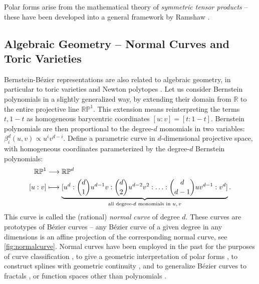 \documentclass[12pt,final,3p]{elsarticle}
\begin{document}
Polar forms arise from the mathematical theory of \emph{symmetric tensor products} -- these have been developed into a general  framework by Ramshaw \cite{ramshaw2001paired}.

\subsection{Algebraic Geometry -- Normal Curves and Toric Varieties}\label{sec:motivation:newton}

Bernstein-B\'{e}zier representations are also related to algebraic geometry, in particular to toric varieties and Newton polytopes \cite{sottile2015algebraic}. Let us consider Bernstein polynomials in a slightly generalized way, by extending their domain from $\mathbb{R}$ to the entire projective line $\mathbb{RP}^{1}$.  This extension means reinterpreting the terms $t,1-t$ as homogeneous barycentric coordinates $[u:v] = [t:1-t]$. Bernstein polynomials are then proportional to the  degree-$d$ monomials in two variables: $\beta^{d}_{i}(u,v) \propto u^{i}v^{d-i}$. Define a parametric curve in $d$-dimensional projective space, with homogeneous coordinates parameterized by the degree-$d$ Bernstein polynomials:
\begin{align}\label{eq:veronese} \notag \mathbb{RP}^{1} & \longrightarrow \mathbb{RP}^{d} \\
\left[u : v\right] & \longmapsto \underbrace{[u^{d} : {d \choose 1}u^{d-1}v : {d \choose 2}u^{d-2}v^{2} : \ldots : {d \choose d-1}u v^{d-1} : v^{d}]}_{\text{all degree-$d$ monomials in $u,v$}}. \end{align}
This curve is called the (rational) \emph{normal curve} of degree $d$. These curves are prototypes of B\'{e}zier curves -- any B\'{e}zier curve of a given degree in any dimensions is an affine projection of the corresponding normal curve, see \autoref{fig:normalcurve}. Normal curves have been employed in the past for the purposes of curve classification \cite{degen1988some,pottmann1992classification}, to give a geometric interpretation of polar forms \cite{mazure1999blossoming}, to construct splines with geometric continuity \cite{seidel1993polar}, and to generalize B\'{e}zier curves to fractals \cite{goldman2004fractal}, or function spaces other than polynomials \cite{pottmann1993geometry}. 
\end{document}
